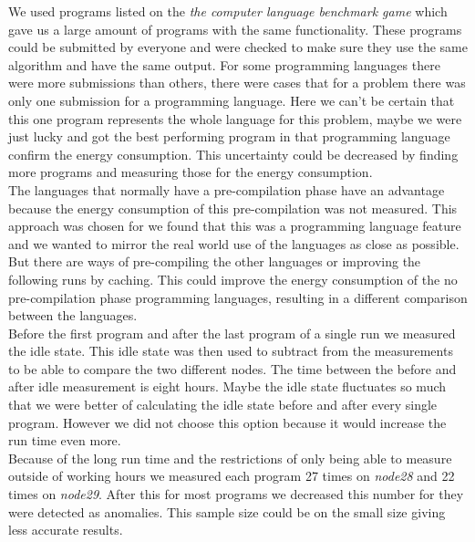 We used programs listed on the \textit{the computer language benchmark game} which gave us a large amount of programs with the same functionality. These programs could be submitted by everyone and were checked to make sure they use the same algorithm and have the same output. For some programming languages there were more submissions than others, there were cases that for a problem there was only one submission for a programming language. Here we can't be certain that this one program represents the whole language for this problem, maybe we were just lucky and got the best performing program in that programming language confirm the energy consumption. This uncertainty could be decreased by finding more programs and measuring those for the energy consumption.\\

The languages that normally have a pre-compilation phase have an advantage because the energy consumption of this pre-compilation was not measured. This approach was chosen for we found that this was a programming language feature and we wanted to mirror the real world use of the languages as close as possible. But there are ways of pre-compiling the other languages or improving the following runs by caching. This could improve the energy consumption of the no pre-compilation phase programming languages, resulting in a different comparison between the languages.\\

Before the first program and after the last program of a single run we measured the idle state. This idle state was then used to subtract from the measurements to be able to compare the two different nodes. The time between the before and after idle measurement is eight hours. Maybe the idle state fluctuates so much that we were better of calculating the idle state before and after every single program. However we did not choose this option because it would increase the run time even more.\\

Because of the long run time and the restrictions of only being able to measure outside of working hours we measured each program 27 times on \textit{node28} and 22 times on \textit{node29}. After this for most programs we decreased this number for they were detected as anomalies. This sample size could be on the small size giving less accurate results.